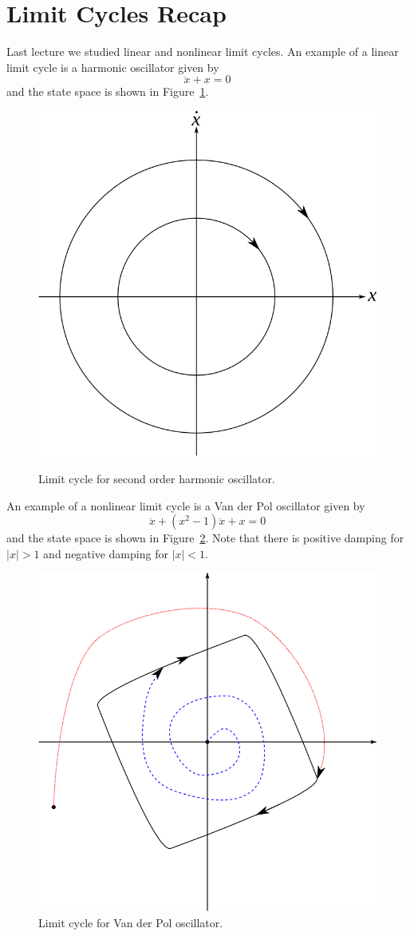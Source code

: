 
\mainmatter%
\setcounter{page}{1}

\lectureseries[\course]{\course}

\date{January 7, 2010}

\setaddress%

\setcounter{lecture}{1}
\setcounter{chapter}{1}

\label{lec:mae281a_lec02}

\section{Limit Cycles Recap}
Last lecture we studied linear and nonlinear limit cycles. An example of a linear limit cycle is a  harmonic oscillator given by
$$\ddot{x} + x = 0$$
and the state space is shown in Figure~\ref{fig:02secondorder}.

\begin{figure}[ht!]
\centering
\includegraphics[width=.4\textwidth]{images/01secondorder}
\label{fig:02secondorder}
\caption{Limit cycle for second order harmonic oscillator.}
\end{figure}

An example of a nonlinear limit cycle is a Van der Pol oscillator given by
$$\ddot{x} + (x^2-1)\ddot{x} + x = 0$$
and the state space is shown in Figure~\ref{fig:02vdplc}. Note that there is positive damping for $|x|>1$ and negative damping for $|x|<1$.

\begin{figure}[ht!]
\centering
\includegraphics[width=.4\textwidth]{images/02vdplc}
\caption{Limit cycle for Van der Pol oscillator.}
\label{fig:02vdplc}
\end{figure}

